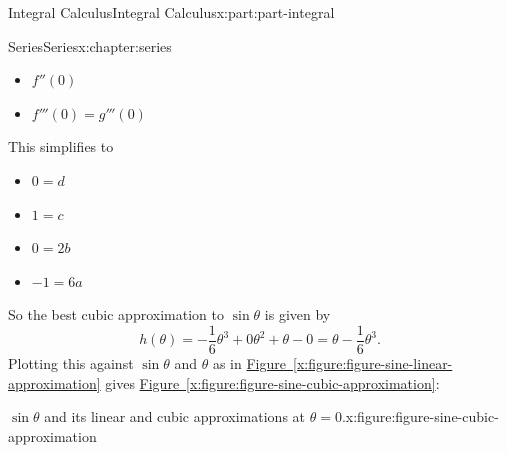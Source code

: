 \documentclass[twoside,10pt,]{tufte-book}
\newcommand{\xreffont}{\relax}
\numberwithin{equation}{part}
\begin{document}
\begin{partptx}{Integral Calculus}{}{Integral Calculus}{}{}{x:part:part-integral}
\begin{chapterptx}{Series}{}{Series}{}{}{x:chapter:series}
\begin{introduction}{}
\begin{itemize}[label=\textbullet]
\item{}\(\displaystyle f''(0)\)%
\item{}\(\displaystyle f'''(0) = g'''(0)\)%
\end{itemize}
This simplifies to%
%
\begin{itemize}[label=\textbullet]
\item{}\(\displaystyle 0 = d\)%
\item{}\(\displaystyle 1 = c\)%
\item{}\(\displaystyle 0 = 2b\)%
\item{}\(\displaystyle -1 = 6a\)%
\end{itemize}
So the best cubic approximation to \(\sin\theta\) is given by%
\begin{equation*}
h(\theta) = -\frac{1}{6}\theta^{3} + 0\theta^{2} + \theta - 0 = \theta  -\frac{1}{6}\theta^{3}.
\end{equation*}
Plotting this against \(\sin \theta\) and \(\theta\) as in \hyperref[x:figure:figure-sine-linear-approximation]{Figure~{\xreffont\ref{x:figure:figure-sine-linear-approximation}}} gives \hyperref[x:figure:figure-sine-cubic-approximation]{Figure~{\xreffont\ref{x:figure:figure-sine-cubic-approximation}}}:%
\begin{figureptx}{\(\sin\theta\) and its linear and cubic approximations at \(\theta=0\).}{x:figure:figure-sine-cubic-approximation}{}%
\begin{image}{0}{1}{0}%
\end{image}
\end{figureptx}
\end{introduction}
\end{chapterptx}
\end{partptx}
\end{document}
